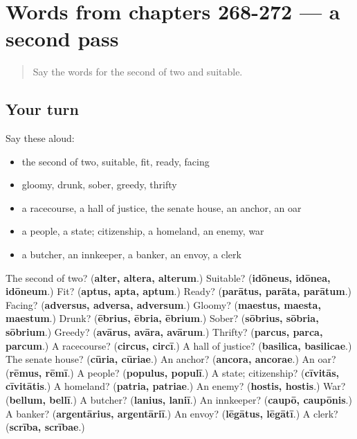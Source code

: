 \section[(dialogue)]{Words from chapters 268-272 — a second pass}

\label{lesson:LA-R272-second-pass-words-from-chapters-268-272}



\begin{quote}
Say the words for the second of two and suitable.
\end{quote}

\subsection*{Your turn}
Say these aloud:

\begin{itemize}
\raggedright
  \item the second of two, suitable, fit, ready, facing
  \item gloomy, drunk, sober, greedy, thrifty
  \item a racecourse, a hall of justice, the senate house, an anchor, an oar
  \item a people, a state; citizenship, a homeland, an enemy, war
  \item a butcher, an innkeeper, a banker, an envoy, a clerk
\end{itemize}

\begin{tcolorbox}[breakable,colback=teal!4,colframe=teal!35!black,title={Before you move on}]
The second of two? (\textbf{alter, altera, alterum}.) Suitable? (\textbf{idōneus, idōnea, idōneum}.) Fit? (\textbf{aptus, apta, aptum}.) Ready? (\textbf{parātus, parāta, parātum}.) Facing? (\textbf{adversus, adversa, adversum}.) Gloomy? (\textbf{maestus, maesta, maestum}.) Drunk? (\textbf{ēbrius, ēbria, ēbrium}.) Sober? (\textbf{sōbrius, sōbria, sōbrium}.) Greedy? (\textbf{avārus, avāra, avārum}.) Thrifty? (\textbf{parcus, parca, parcum}.) A racecourse? (\textbf{circus, circī}.) A hall of justice? (\textbf{basilica, basilicae}.) The senate house? (\textbf{cūria, cūriae}.) An anchor? (\textbf{ancora, ancorae}.) An oar? (\textbf{rēmus, rēmī}.) A people? (\textbf{populus, populī}.) A state; citizenship? (\textbf{cīvitās, cīvitātis}.) A homeland? (\textbf{patria, patriae}.) An enemy? (\textbf{hostis, hostis}.) War? (\textbf{bellum, bellī}.) A butcher? (\textbf{lanius, laniī}.) An innkeeper? (\textbf{caupō, caupōnis}.) A banker? (\textbf{argentārius, argentāriī}.) An envoy? (\textbf{lēgātus, lēgātī}.) A clerk? (\textbf{scrība, scrībae}.)
\end{tcolorbox}
